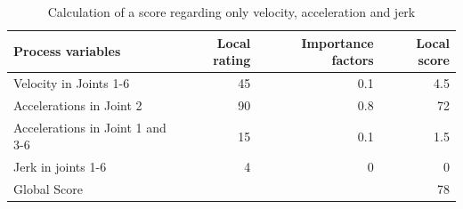 \begin{table}[H]
	\centering
	\begin{tabular}{||l|r|r|r||}
		Process variables & Local rating & Importance factors & Local score\\
		\hline
		\hline
		\hline
		Velocity in Joints 1-6& 45& 0.1&4.5\\
		Accelerations in Joint 2& 90 & 0.8 & 72\\
		Accelerations in Joint 1 and 3-6 & 15& 0.1&1.5\\
		Jerk in joints 1-6& 4& 0&0\\
		
		\hline
		\hline
		\hline
		Global Score& & &78\\
		\hline
		\hline
	\end{tabular}
	
	\caption{Calculation of a score regarding only velocity, acceleration and jerk}
	\label{VAJ}
\end{table}

